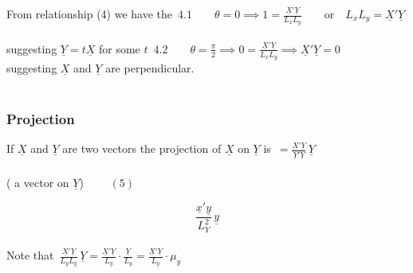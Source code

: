 \documentclass[11pt,a4paper]{article}
\theoremstyle{definition}
\begin{document}
From relationship (4) we have the \,$\displaystyle{4.1\qquad  \theta = 0 \implies 1 = \frac{\underline{X}'\underline{Y}}{L_xL_y}\qquad\text{or}\quad  L_xL_y = \underline{X}'\underline{Y}}$\\\\

suggesting $\underline{Y} = t\underline{X}$ for some $t$ \,$\displaystyle{4.2\qquad  \theta = \frac{\pi}{2}\implies 0 = \frac{\underline{X}'\underline{Y}}{L_xL_y}\implies  \underline{X}'\underline{Y} = 0}$\\


suggesting $\underline{X}$ and $\underline{Y}$ are perpendicular.\\\\




\subsubsection{Projection}
If $\underline{X}$ and $\underline{Y}$ are two vectors the projection of $\underline{X}$ on $\underline{Y}$ is \,$\displaystyle{= \frac{\underline{X}'\underline{Y}}{\underline{Y}'\underline{Y}}\,\underline{Y}}$\\\\
( a vector on $\underline{Y}$) $\qquad (5)$\\

\begin{figure}[H]
\centering
{}
\end{figure}


$$\frac{\underline{x}'\underline{y}}{L^2_Y}\,\underline{y}$$\\

















Note that\, $\displaystyle{\frac{\underline{X}'\underline{Y}}{L_yL_y}\, \underline{Y}= \frac{\underline{X}'\underline{Y}}{L_y}\cdot \frac{\underline{Y}}{L_y}=\frac{\underline{X}'\underline{Y}}{L_y}\cdot \mu_y}$\\\\
\end{document}
